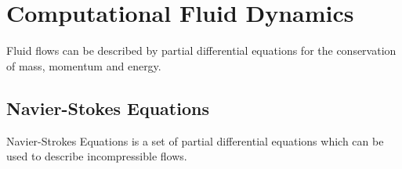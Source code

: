 \section{Computational Fluid Dynamics}

Fluid flows can be described by partial differential equations for the conservation 
of mass, momentum and energy. 

\subsection{Navier-Stokes Equations}

Navier-Strokes Equations is a set of partial differential equations which can be
used to describe incompressible flows\cite{fluidDynamicsIntro}.
